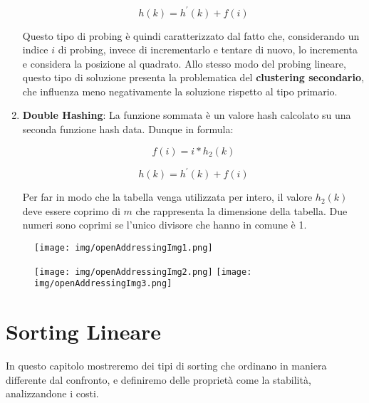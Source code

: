 \documentclass{article}
\begin{document}
\begin{enumerate}
    \begin{equation}
        h(k)=h^{'}(k)+f(i)
    \end{equation}

Questo tipo di probing è quindi caratterizzato dal fatto che, considerando un indice $i$ di probing, invece di incrementarlo e tentare di nuovo, lo incrementa e considera la posizione al quadrato. Allo stesso modo del probing lineare, questo tipo di soluzione presenta la problematica del \textbf{clustering secondario}, che influenza meno negativamente la soluzione rispetto al tipo primario.

\item \textbf{Double Hashing}: La funzione sommata è un valore hash calcolato su una seconda funzione hash data. Dunque in formula:

\begin{equation}
    f(i)=i*h_{2}(k)
\end{equation}

\begin{equation}
    h(k)=h^{'}(k)+f(i)
\end{equation}

Per far in modo che la tabella venga utilizzata per intero, il valore $h_{2}(k)$ deve essere coprimo di $m$ che rappresenta la dimensione della tabella.
Due numeri sono coprimi se l'unico divisore che hanno in comune è 1.
    
\end{enumerate}

\begin{figure}[htbp]
        \center
        \texttt{[image: img/openAddressingImg1.png]}
    \end{figure}

    \begin{figure}[htbp]
        \center
        \texttt{[image: img/openAddressingImg2.png]}
        \texttt{[image: img/openAddressingImg3.png]}
    \end{figure}



\newpage

\section{Sorting Lineare}

In questo capitolo mostreremo dei tipi di sorting che ordinano in maniera differente dal 
confronto, e definiremo delle proprietà come la stabilità, analizzandone i costi.
\end{document}
